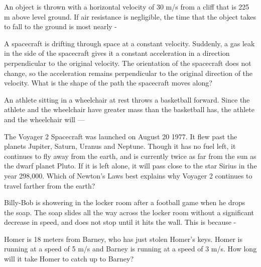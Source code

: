 \documentclass[10pt]{examdesign}
\begin{document}
\begin{multiplechoice} [title={Multiple Choice},
	rearrange=yes]
\begin{question} An object is thrown with a horizontal velocity of 30 m/s from a cliff that is 225 m above level ground.  If air resistance is negligible, the time that the object takes to fall to the ground is most nearly - 

\end{question}


\begin{question}
A spacecraft is drifting through space at a constant velocity.  Suddenly, a gas leak in the side of the spacecraft gives it a constant acceleration in a direction perpendicular to the original velocity.  The orientation of the spacecraft does not change, so the acceleration remains perpendicular to the original direction of the velocity.  What is the shape of the path the spacecraft moves along?  

\end{question}

\begin{question}
	An athlete sitting in a wheelchair at rest throws a basketball forward. Since the athlete and the wheelchair have greater mass than the basketball has, the athlete and the wheelchair will — 

\end{question}


\begin{question}
	The Voyager 2 Spacecraft was launched on August 20 1977.  It flew past the planets Jupiter, Saturn, Uranus and Neptune.  Though it has no fuel left, it continues to fly away from the earth, and is currently twice as far from the sun as the dwarf planet Pluto.  If it is left alone, it will pass close to the star Sirius in the year 298,000.  Which of Newton's Laws best explains why Voyager 2 continues to travel farther from the earth?

\end{question}

\begin{question}
	Billy-Bob is showering in the locker room after a football game when he drops the soap.  The soap slides all the way across the locker room without a significant decrease in speed, and does not stop until it hits the wall.  This is because - 

\end{question}

\begin{question}
	Homer is 18 meters from Barney, who has just stolen Homer's keys.  Homer is running at a speed of 5 m/s and Barney is running at a speed of 3 m/s.  How long will it take Homer to catch up to Barney?


\end{question}
\end{multiplechoice}
\end{document}
